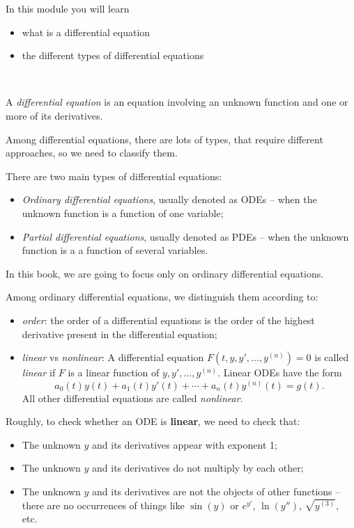 In this module you will learn
\begin{itemize}
	\item what is a differential equation
	\item the different types of differential equations
\end{itemize}

\hfill \\[-10pt]


\begin{definition}
	A \emph{differential equation} is an equation involving an unknown function and one or more of its derivatives.
\end{definition}


Among differential equations, there are lots of types, that require different approaches, so we need to classify them.

\begin{definition}
	There are two main types of differential equations:
	\begin{itemize}
		\item \emph{Ordinary differential equations}, usually denoted as ODEs -- when the unknown function is a function of one variable;
		\item \emph{Partial differential equations}, usually denoted as PDEs -- when the unknown function is a a function of several variables.
	\end{itemize}	
	
	In this book, we are going to focus only on ordinary differential equations.
	
	Among ordinary differential equations, we distinguish them according to:
	\begin{itemize}
		\item \emph{order}: the order of a differential equations is the order of the highest derivative present in the differential equation;
		\item \emph{linear} vs \emph{nonlinear}: A differential equation \quad $F(t,y,y',\ldots,y^{(n)}) = 0$ \quad is called \emph{linear} if $F$ is a linear function of $y, y', \ldots, y^{(n)}$. Linear ODEs have the form
			$$ a_0(t) y(t) + a_1(t) y'(t) + \cdots + a_n(t) y^{(n)}(t) = g(t). $$
			All other differential equations are called \emph{nonlinear}.
	\end{itemize}
\end{definition}

\begin{graybox}
	Roughly, to check whether an ODE is \textbf{linear}, we need to check that:
	\begin{itemize}
		\item The unknown $y$ and its derivatives appear with exponent 1;
		\item The unknown $y$ and its derivatives do not multiply by each other;
		\item The unknown $y$ and its derivatives are not the objects of other functions -- there are no occurrences of things like $\sin(y)$ or $e^{y'}$, $\ln(y'')$, $\sqrt{y^{(3)}}$, etc.
	\end{itemize}
\end{graybox}

